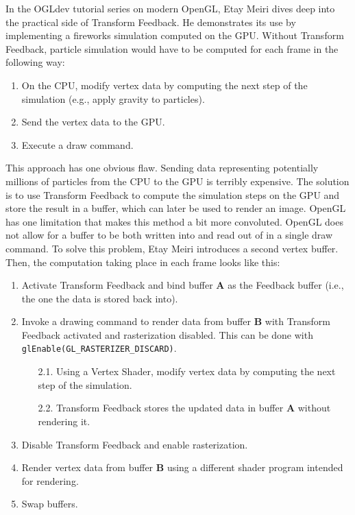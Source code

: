 \documentclass[
  digital,     %
  oneside,     %
  nosansbold,  %
  nocolorbold, %
  lof,         %
  lot,         %
]{fithesis4}
\begin{document}
In the OGLdev tutorial series on modern OpenGL, Etay Meiri \cite{ogl-particle-system} dives deep into the practical
side of Transform Feedback. He demonstrates its use by implementing a fireworks simulation computed on the GPU.
Without Transform Feedback, particle simulation would have to be computed for each frame in the following way:
\begin{enumerate}
    \item On the CPU, modify vertex data by computing the next step of the simulation (e.g., apply gravity to particles).
    \item Send the vertex data to the GPU.
    \item Execute a draw command.
\end{enumerate}
This approach has one obvious flaw. Sending data representing potentially millions of particles from the CPU to the GPU
is terribly expensive. The solution is to use Transform Feedback to compute the simulation steps on the GPU and store
the result in a buffer, which can later be used to render an image. OpenGL has one limitation that makes this method
a bit more convoluted. OpenGL does not allow for a buffer to be both written into and read out of in a single draw command.
To solve this problem, Etay Meiri \cite{ogl-particle-system} introduces a second vertex buffer.
Then, the computation taking place in each frame looks like this:
\begin{enumerate}
    \item Activate Transform Feedback and bind buffer \textbf{A} as the Feedback
    buffer (i.e., the one the data is stored back into).

    \item Invoke a drawing command to render data from buffer \textbf{B} with Transform Feedback activated
    and rasterization disabled. This can be done with \verb+glEnable(GL_RASTERIZER_DISCARD)+.
    \begin{enumerate}
        \item[2.1.] Using a Vertex Shader, modify vertex data by computing the next step of the simulation.
        
        \item[2.2.] Transform Feedback stores the updated data in buffer \textbf{A} without rendering it.
    \end{enumerate}
    
    \item Disable Transform Feedback and enable rasterization.
    
    \item Render vertex data from buffer \textbf{B} using a different shader program intended for rendering.
    
    \item Swap buffers.
\end{enumerate}
\end{document}
